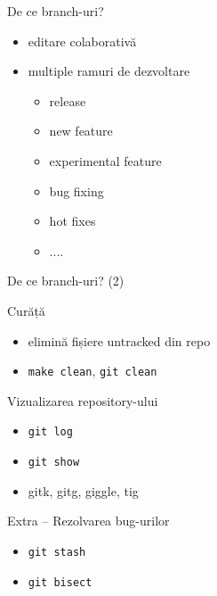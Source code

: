 \documentclass{beamer}
\begin{document}
\begin{frame}{De ce branch-uri?}
  \begin{itemize}
    \item editare colaborativă
    \item multiple ramuri de dezvoltare
      \begin{itemize}
        \item release
        \item new feature
        \item experimental feature
        \item bug fixing
        \item hot fixes
        \item ....
      \end{itemize}
  \end{itemize}
\end{frame}

\begin{frame}{De ce branch-uri? (2)}
  \begin{center}
\end{center}
\end{frame}

\begin{frame}{Curăță}
  \begin{itemize}
    \item elimină fișiere untracked din repo
    \item \texttt{make clean}, \texttt{git clean}
  \end{itemize}
\end{frame}

\begin{frame}{Vizualizarea repository-ului}
  \begin{itemize}
    \item \texttt{git log}
    \item \texttt{git show}
    \item gitk, gitg, giggle, tig
  \end{itemize}
\end{frame}

\begin{frame}{Extra -- Rezolvarea bug-urilor}
  \begin{itemize}
    \item \texttt{git stash}
    \item \texttt{git bisect}
  \end{itemize}
\end{frame}
\end{document}
